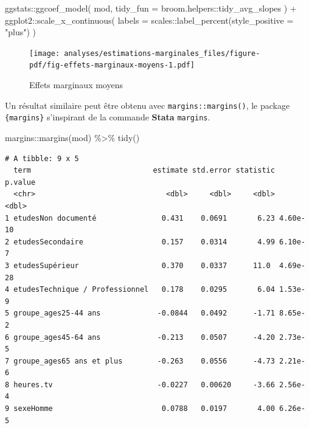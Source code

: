 \documentclass[
  letterpaper,
  DIV=11,
  numbers=noendperiod,
  oneside]{scrreprt}
\newenvironment{Shaded}{\begin{snugshade}}{\end{snugshade}}
\newcommand{\AttributeTok}[1]{\textcolor[rgb]{0.40,0.45,0.13}{#1}}
\newcommand{\FunctionTok}[1]{\textcolor[rgb]{0.28,0.35,0.67}{#1}}
\newcommand{\NormalTok}[1]{\textcolor[rgb]{0.00,0.23,0.31}{#1}}
\newcommand{\SpecialCharTok}[1]{\textcolor[rgb]{0.37,0.37,0.37}{#1}}
\newcommand{\StringTok}[1]{\textcolor[rgb]{0.13,0.47,0.30}{#1}}
\begin{document}
\begin{Shaded}
\begin{Highlighting}[]
\NormalTok{ggstats}\SpecialCharTok{::}\FunctionTok{ggcoef\_model}\NormalTok{(}
\NormalTok{  mod,}
  \AttributeTok{tidy\_fun =}\NormalTok{ broom.helpers}\SpecialCharTok{::}\NormalTok{tidy\_avg\_slopes}
\NormalTok{) }\SpecialCharTok{+}
\NormalTok{  ggplot2}\SpecialCharTok{::}\FunctionTok{scale\_x\_continuous}\NormalTok{(}
    \AttributeTok{labels =}\NormalTok{ scales}\SpecialCharTok{::}\FunctionTok{label\_percent}\NormalTok{(}\AttributeTok{style\_positive =} \StringTok{"plus"}\NormalTok{)}
\NormalTok{  )}
\end{Highlighting}
\end{Shaded}

\begin{figure}[H]

{\centering \texttt{[image: analyses/estimations-marginales\_files/figure-pdf/fig-effets-marginaux-moyens-1.pdf]}

}

\caption{\label{fig-effets-marginaux-moyens}Effets marginaux moyens}

\end{figure}

Un résultat similaire peut être obtenu avec \texttt{margins::margins()},
le package \texttt{\{margins\}} s'inspirant de la commande
\textbf{Stata} \texttt{margins}.

\begin{Shaded}
\begin{Highlighting}[]
\NormalTok{margins}\SpecialCharTok{::}\FunctionTok{margins}\NormalTok{(mod) }\SpecialCharTok{\%\textgreater{}\%} \FunctionTok{tidy}\NormalTok{()}
\end{Highlighting}
\end{Shaded}

\begin{verbatim}
# A tibble: 9 x 5
  term                            estimate std.error statistic  p.value
  <chr>                              <dbl>     <dbl>     <dbl>    <dbl>
1 etudesNon documenté               0.431    0.0691       6.23 4.60e-10
2 etudesSecondaire                  0.157    0.0314       4.99 6.10e- 7
3 etudesSupérieur                   0.370    0.0337      11.0  4.69e-28
4 etudesTechnique / Professionnel   0.178    0.0295       6.04 1.53e- 9
5 groupe_ages25-44 ans             -0.0844   0.0492      -1.71 8.65e- 2
6 groupe_ages45-64 ans             -0.213    0.0507      -4.20 2.73e- 5
7 groupe_ages65 ans et plus        -0.263    0.0556      -4.73 2.21e- 6
8 heures.tv                        -0.0227   0.00620     -3.66 2.56e- 4
9 sexeHomme                         0.0788   0.0197       4.00 6.26e- 5
\end{verbatim}
\end{document}
